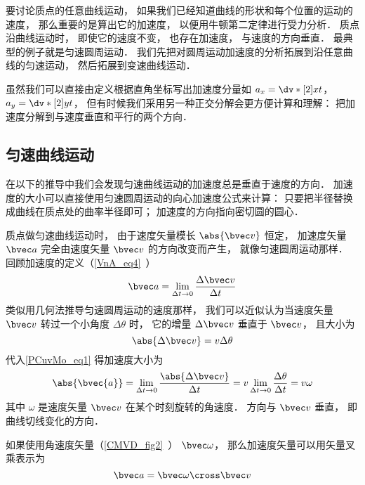 

要讨论质点的任意曲线运动， 如果我们已经知道曲线的形状和每个位置的运动的速度， 那么重要的是算出它的加速度， 以便用牛顿第二定律进行受力分析． 质点沿曲线运动时， 即使它的速度不变， 也存在加速度， 与速度的方向垂直． 最典型的例子就是匀速圆周运动． 我们先把对圆周运动加速度的分析拓展到沿任意曲线的匀速运动， 然后拓展到变速曲线运动．

虽然我们可以直接由定义根据直角坐标写出加速度分量如 $a_x = \dv*[2]{x}{t}$， $a_y = \dv*[2]{y}{t}$， 但有时候我们采用另一种正交分解会更方便计算和理解： 把加速度分解到与速度垂直和平行的两个方向．

\subsection{匀速曲线运动}
在以下的推导中我们会发现匀速曲线运动的加速度总是垂直于速度的方向． 加速度的大小可以直接使用匀速圆周运动的向心加速度公式来计算： 只要把半径替换成曲线在质点处的曲率半径即可； 加速度的方向指向密切圆的圆心．

质点做匀速曲线运动时， 由于速度矢量模长 $\abs{\bvec v}$ 恒定， 加速度矢量 $\bvec a$ 完全由速度矢量 $\bvec v$ 的方向改变而产生， 就像匀速圆周运动那样． 回顾加速度的定义（\autoref{VnA_eq4}~）
\begin{equation}\label{PCuvMo_eq2}
\bvec a = \lim_{\Delta t \to 0} \frac{\Delta \bvec v}{\Delta t}
\end{equation}
类似用几何法推导匀速圆周运动的速度那样， 我们可以近似认为当速度矢量 $\bvec v$ 转过一个小角度 $\Delta \theta$ 时， 它的增量 $\Delta \bvec v$ 垂直于 $\bvec v$， 且大小为
\begin{equation}\label{PCuvMo_eq1}
\abs{\Delta \bvec v} = v\Delta\theta
\end{equation}
代入\autoref{PCuvMo_eq1} 得加速度大小为
\begin{equation}\label{PCuvMo_eq4}
\abs{\bvec{a}} = \lim_{\Delta t \to 0} \frac{\abs{\Delta \bvec v}}{\Delta t}
= v\lim_{\Delta t \to 0}\frac{\Delta \theta}{\Delta t} = v\omega
\end{equation}
其中 $\omega$ 是速度矢量 $\bvec v$ 在某个时刻旋转的角速度． 方向与 $\bvec v$ 垂直， 即曲线切线变化的方向．

如果使用角速度矢量（\autoref{CMVD_fig2}~） $\bvec \omega$， 那么加速度矢量可以用矢量叉乘表示为
\begin{equation}
\bvec a = \bvec \omega \cross \bvec v
\end{equation}


